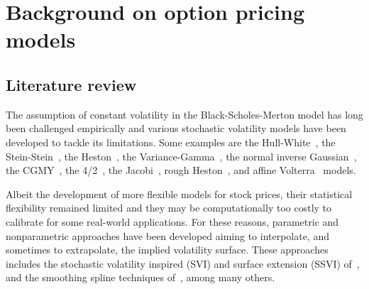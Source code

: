 
\section{Background on option pricing models} \label{sec:bs}

\subsection{Literature review}\label{sec:litrev}


The assumption of constant volatility in the Black-Scholes-Merton model has long been challenged empirically and various stochastic volatility models have been developed to tackle its limitations.
Some examples are the Hull-White~\cite{hull1987pricing}, the Stein-Stein~\cite{stein1991stock}, the Heston~\cite{heston1993closed}, the Variance-Gamma~\cite{madan1998variance}, the normal inverse Gaussian~\cite{barndorff1997processes}, the CGMY~\cite{carr2002fine}, the 4/2~\cite{grasselli2017}, the Jacobi~\cite{ackerer2018jacobi}, rough Heston~\cite{el2019characteristic}, and affine Volterra~\cite{jaber2017affine} models.

Albeit the development of more flexible models for stock prices, their statistical flexibility remained limited and they may be computationally too costly to calibrate for some real-world applications.
For these reasons, parametric and nonparametric approaches have been developed aiming to interpolate, and sometimes to extrapolate, the implied volatility surface.
These approaches includes the stochastic volatility inspired (SVI) and surface extension (SSVI) of~\cite{gatheral2004parsimonious, gatheral2014arbitrage}, and the smoothing spline techniques of~\cite{fengler2009arbitrage, corlay2016b}, 
among many others.

